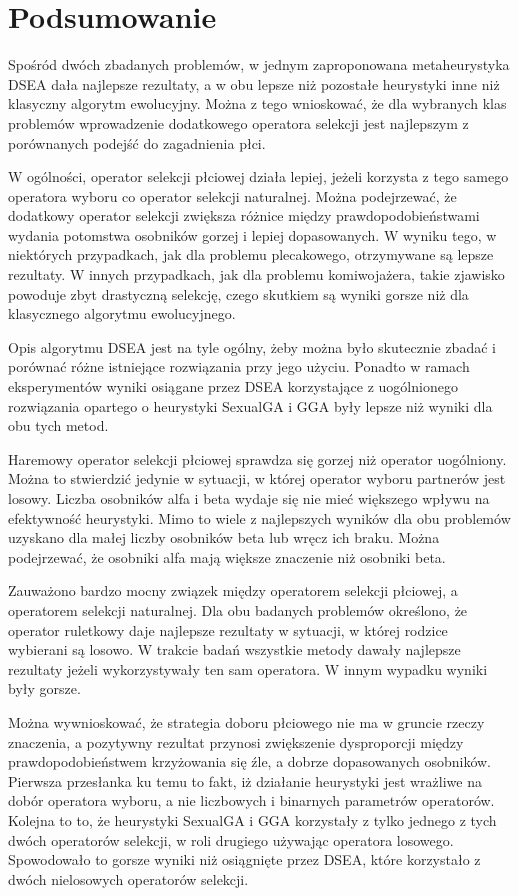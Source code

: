 \documentclass[./FM_mgr.tex]{subfiles}
\begin{document}
\chapter{Podsumowanie}

Spośród dwóch zbadanych problemów, w jednym zaproponowana metaheurystyka DSEA dała najlepsze rezultaty, a w obu lepsze niż pozostałe heurystyki inne niż klasyczny algorytm ewolucyjny.
Można z tego wnioskować, że dla wybranych klas problemów wprowadzenie dodatkowego operatora selekcji jest najlepszym z porównanych podejść do zagadnienia płci.

W ogólności, operator selekcji płciowej działa lepiej, jeżeli korzysta z tego samego operatora wyboru co operator selekcji naturalnej.
Można podejrzewać, że dodatkowy operator selekcji zwiększa różnice między prawdopodobieństwami wydania potomstwa osobników gorzej i lepiej dopasowanych.
W wyniku tego, w niektórych przypadkach, jak dla problemu plecakowego, otrzymywane są lepsze rezultaty.
W innych przypadkach, jak dla problemu komiwojażera, takie zjawisko powoduje zbyt drastyczną selekcję, czego skutkiem są wyniki gorsze niż dla klasycznego algorytmu ewolucyjnego.

Opis algorytmu DSEA jest na tyle ogólny, żeby można było skutecznie zbadać i porównać różne istniejące rozwiązania przy jego użyciu.
Ponadto w ramach eksperymentów wyniki osiągane przez DSEA korzystające z uogólnionego rozwiązania opartego o heurystyki SexualGA i GGA były lepsze niż wyniki dla obu tych metod.

Haremowy operator selekcji płciowej sprawdza się gorzej niż operator uogólniony.
Można to stwierdzić jedynie w sytuacji, w której operator wyboru partnerów jest losowy.
Liczba osobników alfa i beta wydaje się nie mieć większego wpływu na efektywność heurystyki.
Mimo to wiele z najlepszych wyników dla obu problemów uzyskano dla małej liczby osobników beta lub wręcz ich braku.
Można podejrzewać, że osobniki alfa mają większe znaczenie niż osobniki beta.

Zauważono bardzo mocny związek między operatorem selekcji płciowej, a operatorem selekcji naturalnej.
Dla obu badanych problemów określono, że operator ruletkowy daje najlepsze rezultaty w sytuacji, w której rodzice wybierani są losowo.
W trakcie badań wszystkie metody dawały najlepsze rezultaty jeżeli wykorzystywały ten sam operatora.
W innym wypadku wyniki były gorsze.

Można wywnioskować, że strategia doboru płciowego nie ma w gruncie rzeczy znaczenia, a pozytywny rezultat przynosi zwiększenie dysproporcji między prawdopodobieństwem krzyżowania się źle, a dobrze dopasowanych osobników.
Pierwsza przesłanka ku temu to fakt, iż działanie heurystyki jest wrażliwe na dobór operatora wyboru, a nie liczbowych i binarnych parametrów operatorów.
Kolejna to to, że heurystyki SexualGA i GGA korzystały z tylko jednego z tych dwóch operatorów selekcji, w roli drugiego używając operatora losowego.
Spowodowało to gorsze wyniki niż osiągnięte przez DSEA, które korzystało z dwóch nielosowych operatorów selekcji.
\end{document}
